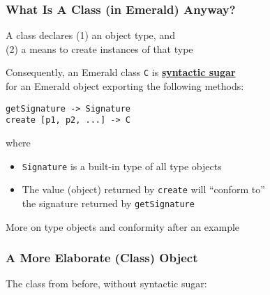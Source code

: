 \begin{frame}[fragile]

\frametitle{What Is A Class (in Emerald) Anyway?}

\begin{center}

A class declares (1) an object type, and \\ (2) a means to create
instances of that type

\end{center}

\vspace{\fill}

Consequently, an Emerald class \texttt{C} is
\textbf{\underline{syntactic sugar}}\\ for an Emerald object exporting
the following methods:

\begin{lstlisting}
getSignature -> Signature
create [p1, p2, ...] -> C
\end{lstlisting}

where

\begin{itemize}

\item \lstinline{Signature} is a built-in type of all type objects

\item The value (object) returned by \texttt{create} will ``conform
to''\\ the signature returned by \texttt{getSignature}

\end{itemize}

More on type objects and conformity after an example

\end{frame}

\begin{frame}[fragile]

\frametitle{A More Elaborate (Class) Object}

The class from before, without syntactic sugar:



\end{frame}
